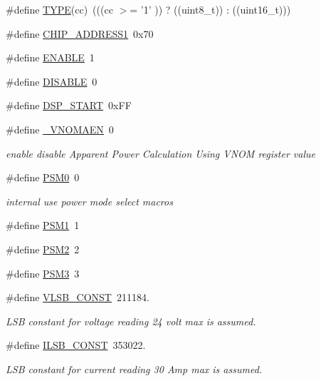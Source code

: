 \begin{DoxyCompactItemize}
\item 
\#define \hyperlink{a00037_ac8f6b0114f40d7bc2177f638088ae0ab}{T\-Y\-P\-E}(cc)~(((cc $>$= '1' )) ? ((uint8\-\_\-t)) \-: ((uint16\-\_\-t)))
\item 
\#define \hyperlink{a00037_a94de2b046db6e10257ef4481c0a15eaa}{C\-H\-I\-P\-\_\-\-A\-D\-D\-R\-E\-S\-S1}~0x70
\item 
\#define \hyperlink{a00037_a514ad415fb6125ba296793df7d1a468a}{E\-N\-A\-B\-L\-E}~1
\item 
\#define \hyperlink{a00037_a99496f7308834e8b220f7894efa0b6ab}{D\-I\-S\-A\-B\-L\-E}~0
\item 
\#define \hyperlink{a00037_ae7c7d554ff023db5a11623df910b93af}{D\-S\-P\-\_\-\-S\-T\-A\-R\-T}~0x\-F\-F
\item 
\#define \hyperlink{a00037_ae22ff0891c8b944bf1b99b2332f16d15}{\-\_\-\-V\-N\-O\-M\-A\-E\-N}~0
\begin{DoxyCompactList}\small\item\em enable disable Apparent Power Calculation Using V\-N\-O\-M register value \end{DoxyCompactList}\item 
\#define \hyperlink{a00037_ad03c0079a6239f78368cb14cc4578101}{P\-S\-M0}~0
\begin{DoxyCompactList}\small\item\em internal use power mode select macros \end{DoxyCompactList}\item 
\#define \hyperlink{a00037_aecb578b36faffafc55d7e5bfbe26df6a}{P\-S\-M1}~1
\item 
\#define \hyperlink{a00037_a954ec88a13030fa5878310aa79f92b59}{P\-S\-M2}~2
\item 
\#define \hyperlink{a00037_aaaecd8504625316f84bd76accbcc42f0}{P\-S\-M3}~3
\item 
\#define \hyperlink{a00037_aef67453964ff5f4b43fa56b18cee9925}{V\-L\-S\-B\-\_\-\-C\-O\-N\-S\-T}~211184.
\begin{DoxyCompactList}\small\item\em L\-S\-B constant for voltage reading 24 volt max is assumed. \end{DoxyCompactList}\item 
\#define \hyperlink{a00037_a88b595bff6a462c91ddc1cafbd6e4140}{I\-L\-S\-B\-\_\-\-C\-O\-N\-S\-T}~353022.
\begin{DoxyCompactList}\small\item\em L\-S\-B constant for current reading 30 Amp max is assumed. \end{DoxyCompactList}\item 

\end{DoxyCompactItemize}
